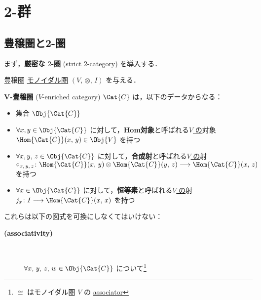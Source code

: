 \documentclass[TQFT_main]{subfiles}
\begin{document}
\section{2-群}

\subsection{豊穣圏と2-圏}

まず，\textbf{厳密な $2$-圏} (strict $2$-category) を導入する．

\begin{mydef}[label=redef:enriched,breakable]{豊穣圏}
    \hyperref[redef:monoidal-category]{モノイダル圏} $(V,\, \otimes,\, I)$ を与える．

    $\bm{V}$\textbf{-豊穣圏} ($V$-enriched category) $\Cat{C}$ は，以下のデータからなる：
    \begin{itemize}
        \item 集合 $\Obj{\Cat{C}}$
        \item $\forall x, y \in \Obj{\Cat{C}}$ に対して，\textbf{Hom対象}と呼ばれる\underline{$V$ の}対象 $\Hom{\Cat{C}}(x,\, y) \in \Obj{V}$ を持つ
        \item $\forall x, y,\, z \in \Obj{\Cat{C}}$ に対して，\textbf{合成射}と呼ばれる\underline{$V$ の}射 $\circ_{x,\, y,\, z} \colon \Hom{\Cat{C}}(x,\, y) \otimes \Hom{\Cat{C}}(y,\, z) \lto \Hom{\Cat{C}} (x,\, z)$ を持つ
        \item $\forall x \in \Obj{\Cat{C}}$ に対して，\textbf{恒等素}と呼ばれる\underline{$V$ の}射 $j_x \colon I \lto \Hom{\Cat{C}} (x,\, x)$ を持つ
    \end{itemize}
    これらは以下の図式を可換にしなくてはいけない：
    \begin{description}
        \item[\textbf{(associativity)}]　
        
        $\forall x,\, y,\, z,\, w \in \Obj{\Cat{C}}$ について\footnote{$\cong$ はモノイダル圏 $V$ の \hyperref[def:monoidal-category]{associator}}
        \begin{flushleft}
        \end{flushleft}
        

\end{description}
\end{mydef}
\end{document}
